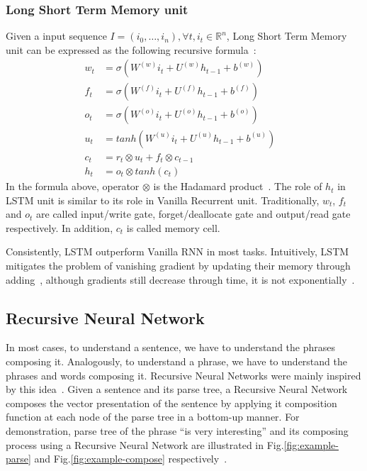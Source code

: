 \subsubsection{Long Short Term Memory unit}\label{sec:lstm}
Given a input sequence \(I = (i_0,\ldots,i_n), \forall t, i_t \in \mathbb{R}^n\), Long Short Term Memory unit can be expressed as the following recursive formula~\cite{treeLSTM}:
\begin{align}
w_t &= \sigma(W^{(w)}i_t + U^{(w)}h_{t-1} + b^{(w)}) \label{eq:lstm-input-gate}&\\
f_t &= \sigma(W^{(f)}i_t + U^{(f)}h_{t-1} + b^{(f)}) \label{eq:lstm-forget-gate}&\\
o_t &= \sigma(W^{(o)}i_t + U^{(o)}h_{t-1} + b^{(o)}) \label{eq:lstm-output-gate}&\\
u_t &= tanh(W^{(u)}i_t + U^{(u)}h_{t-1} + b^{(u)}) \label{eq:lstm-update-gate}&\\
c_t &= r_t \otimes u_t + f_t \otimes c_{t-1} \label{eq:longterm-mem}&\\
h_t &= o_t \otimes tanh(c_t) \label{eq:temperal-mem}&
\end{align}
In the formula above, operator \(\otimes\) is the Hadamard product~\cite{element-prod}.
The role of \(h_t\) in LSTM unit is similar to its role in Vanilla Recurrent unit.
Traditionally, \(w_t\), \(f_t\) and \(o_t\) are called input/write gate, forget/deallocate gate and output/read gate respectively.
In addition, \(c_t\) is called memory cell.

Consistently, LSTM outperform Vanilla RNN in most tasks.
Intuitively, LSTM mitigates the problem of vanishing gradient by updating their memory through adding~\cite{evaluate-GRU}, although gradients still decrease through time, it is not exponentially~\cite{Graves-thesis}.
\subsection{Recursive Neural Network}
In most cases, to understand a sentence, we have to understand the phrases composing it.
Analogously, to understand a phrase, we have to understand the phrases and words composing it.
Recursive Neural Networks were mainly inspired by this idea~\cite{treeLSTM}.
Given a sentence and its parse tree, a Recursive Neural Network composes the vector presentation of the sentence by applying it composition function at each node of the parse tree in a bottom-up manner.
For demonstration, parse tree of the phrase ``is very interesting'' and its composing process using a Recursive Neural Network are illustrated in Fig.\ref{fig:example-parse} and Fig.\ref{fig:example-compose} respectively~\cite{tag-embedding-rnn}.


